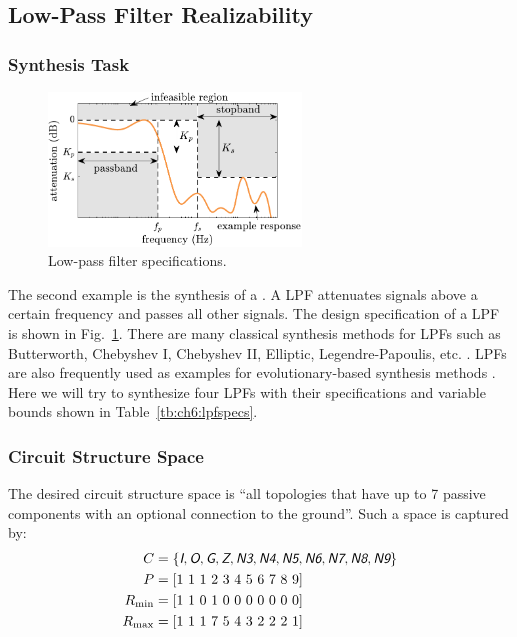 \subsection{Low-Pass Filter Realizability\label{sec:ch6:lpf}}

\subsubsection{Synthesis Task}

\begin{figure}
\centering
\includegraphics[width=0.6\textwidth]{../ch6/figures/reduced/r_filter_specs}
\caption{Low-pass filter specifications.\label{fig:ch6:filter:specs}}
\end{figure}

The second example is the synthesis of a . A LPF attenuates signals above a certain frequency and passes all other signals.
The design specification of a LPF is shown in Fig.~\ref{fig:ch6:filter:specs}.
There are many classical synthesis methods for LPFs such as Butterworth, Chebyshev I, Chebyshev II, Elliptic,  Legendre-Papoulis, etc. \cite{Wanhammar2009a}.
LPFs are also frequently used as examples for evolutionary-based synthesis methods \cite{Das2007a, Gan2010a, Goh2001a, Grimbleby2000a, Koza1997a, Koza2000a, Lohn1999a}.
Here we will try to synthesize four LPFs with their specifications and variable bounds shown in Table~\ref{tb:ch6:lpfspecs}.

\subsubsection{Circuit Structure Space}

The desired circuit structure space is ``all topologies that have up to 7 passive components with an optional connection to the ground''.
Such a space is captured by:
\begin{subequations}
\label{eq:ch6:lib3}
\begin{align}
C &= \{ \textsl{\textsf{I}}, \textsl{\textsf{O}}, \textsl{\textsf{G}}, \textsl{\textsf{Z}}, \textsl{\textsf{N3}}, \textsl{\textsf{N4}}, \textsl{\textsf{N5}}, \textsl{\textsf{N6}}, \textsl{\textsf{N7}}, \textsl{\textsf{N8}}, \textsl{\textsf{N9}} \} \\
P &=        \left[ 1\ 1\ 1\ 2\ 3\ 4\ 5\ 6\ 7\ 8\ 9 \right] \\
R_{\min} &= \left[ 1\ 1\ 0\ 1\ 0\ 0\ 0\ 0\ 0\ 0\ 0 \right] \\
R_{\max} &= \left[ 1\ 1\ 1\ 7\ 5\ 4\ 3\ 2\ 2\ 2\ 1 \right]
\end{align}
\end{subequations}


